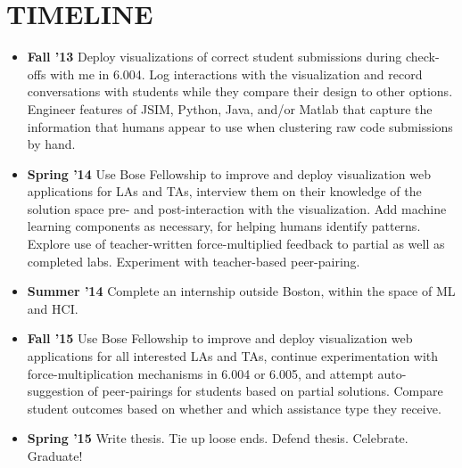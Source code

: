 \documentclass[12pt]{article}
\begin{document}
\section{TIMELINE}

\begin{itemize}
\item {\bf Fall '13} Deploy visualizations of correct student submissions during check-offs with me in 6.004. Log interactions with the visualization and record conversations with students while they compare their design to other options. Engineer features of JSIM, Python, Java, and/or Matlab that capture the information that humans appear to use when clustering raw code submissions by hand. %
\item {\bf Spring '14} Use Bose Fellowship to improve and deploy visualization web applications for LAs and TAs, interview them on their knowledge of the solution space pre- and post-interaction with the visualization. Add machine learning components as necessary, for helping humans identify patterns. Explore use of teacher-written force-multiplied feedback to partial as well as completed labs. Experiment with teacher-based peer-pairing. %
\item {\bf Summer '14} Complete an internship outside Boston, within the space of ML and HCI.
\item {\bf Fall '15} Use Bose Fellowship to improve and deploy visualization web applications for all interested LAs and TAs, continue experimentation with force-multiplication mechanisms in 6.004 or 6.005, and attempt auto-suggestion of peer-pairings for students based on partial solutions. Compare student outcomes based on whether and which assistance type they receive. %
\item {\bf Spring '15} Write thesis. Tie up loose ends. Defend thesis. Celebrate. Graduate!
\end{itemize}
\end{document}
